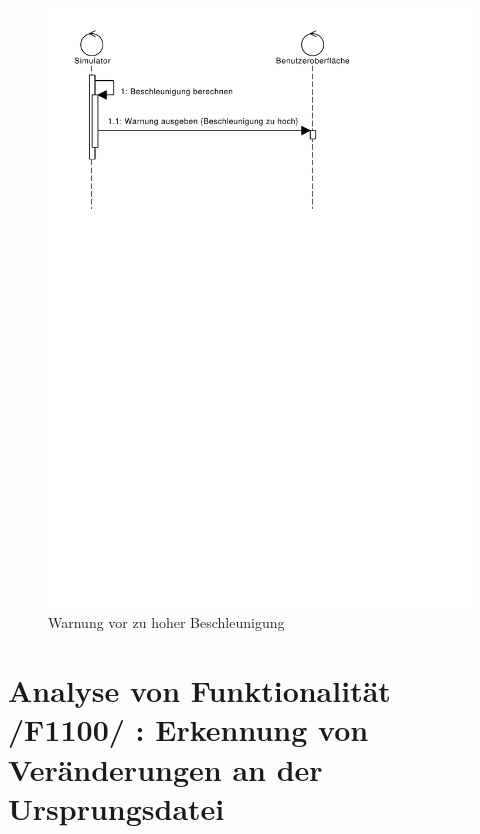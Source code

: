 \begin{figure}[h!]
\includegraphics[width=\linewidth]{bilder/Warnung_Beschleunigung}
\caption{Warnung vor zu hoher Beschleunigung}
\end{figure}
\section{Analyse von Funktionalität /F1100/ :  Erkennung von Veränderungen an der Ursprungsdatei}
